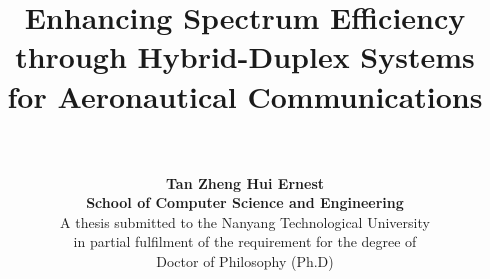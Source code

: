 

\title{\sc
\vspace{-0.5in} Enhancing Spectrum Efficiency through Hybrid-Duplex Systems for Aeronautical Communications\\
\vspace*{0.3in} \centering
{}\\[1em]}




\author{
{\rm\bf Tan Zheng Hui Ernest}\\[1.5em]
{\rm\bf School of Computer Science and Engineering}\\[1.5em]
A thesis submitted to the Nanyang Technological University \\
in partial fulfilment of the requirement for the degree of \\
Doctor of Philosophy (Ph.D)\\[1.5em]
}

\date{\the\year}
\maketitle
\thispagestyle{empty}        %
